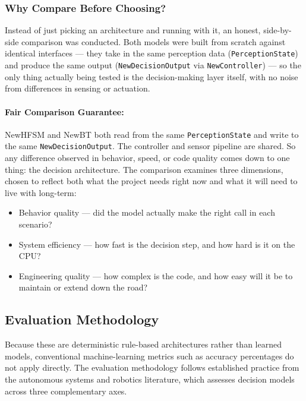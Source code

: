 \documentclass[12pt, a4paper]{report}
\begin{document}
\subsubsection{Why Compare Before Choosing?}

Instead of just picking an architecture and running with it, an honest, side-by-side comparison was conducted. Both models were built from scratch against identical interfaces --- they take in the same perception data (\texttt{PerceptionState}) and produce the same output (\texttt{NewDecisionOutput} via \texttt{NewController}) --- so the only thing actually being tested is the decision-making layer itself, with no noise from differences in sensing or actuation.

\paragraph{Fair Comparison Guarantee:}

NewHFSM and NewBT both read from the same \texttt{PerceptionState} and write to the same \texttt{NewDecisionOutput}. The controller and sensor pipeline are shared. So any difference observed in behavior, speed, or code quality comes down to one thing: the decision architecture. The comparison examines three dimensions, chosen to reflect both what the project needs right now and what it will need to live with long-term:

\begin{itemize}
    \item Behavior quality --- did the model actually make the right call in each scenario?
    \item System efficiency --- how fast is the decision step, and how hard is it on the CPU?
    \item Engineering quality --- how complex is the code, and how easy will it be to maintain or extend down the road?
\end{itemize}

\subsection{Evaluation Methodology}

Because these are deterministic rule-based architectures rather than learned models, conventional machine-learning metrics such as accuracy percentages do not apply directly. The evaluation methodology follows established practice from the autonomous systems and robotics literature, which assesses decision models across three complementary axes.
\end{document}
